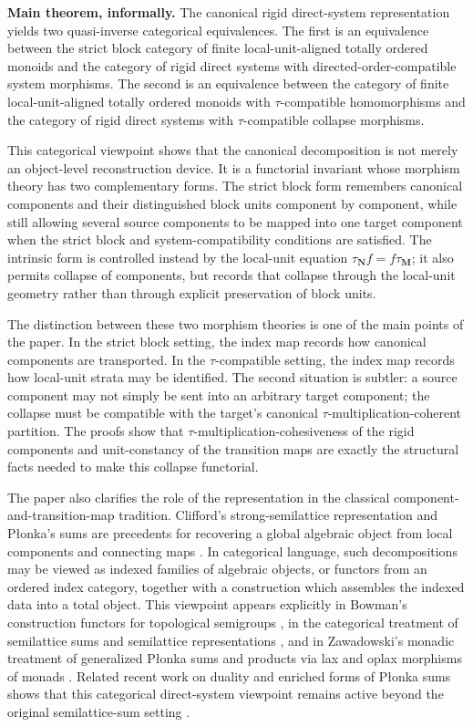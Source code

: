 \documentclass[pdflatex,sn-mathphys-num]{sn-jnl}
\theoremstyle{thmstyleone}%
\theoremstyle{thmstyletwo}%
\theoremstyle{thmstylethree}%
\begin{document}
\medskip
\noindent\textbf{Main theorem, informally.}
The canonical rigid direct-system representation yields two quasi-inverse categorical equivalences.
The first is an equivalence between the strict block category of finite local-unit-aligned totally ordered monoids and the category of rigid direct systems with directed-order-compatible system morphisms.
The second is an equivalence between the category of finite local-unit-aligned totally ordered monoids with \(\tau\)-compatible homomorphisms and the category of rigid direct systems with \(\tau\)-compatible collapse morphisms.
\medskip

This categorical viewpoint shows that the canonical decomposition is not merely an object-level reconstruction device.
It is a functorial invariant whose morphism theory has two complementary forms.
The strict block form remembers canonical components and their distinguished block units component by component, while still allowing several source components to be mapped into one target component when the strict block and system-compatibility conditions are satisfied.
The intrinsic form is controlled instead by the local-unit equation \(\tau_{\mathbf N}f=f\tau_{\mathbf M}\); it also permits collapse of components, but records that collapse through the local-unit geometry rather than through explicit preservation of block units.

The distinction between these two morphism theories is one of the main points of the paper.
In the strict block setting, the index map records how canonical components are transported.
In the \(\tau\)-compatible setting, the index map records how local-unit strata may be identified.
The second situation is subtler: a source component may not simply be sent into an arbitrary target component; the collapse must be compatible with the target's canonical \(\tau\)-multiplication-coherent partition.
The proofs show that \(\tau\)-multiplication-cohesiveness of the rigid components and unit-constancy of the transition maps are exactly the structural facts needed to make this collapse functorial.

The paper also clarifies the role of the representation in the classical component-and-transition-map tradition.
Clifford's strong-semilattice representation and P\l{}onka's sums are precedents for recovering a global algebraic object from local components and connecting maps \cite{Clifford1941,CliffordPreston1961,Plonka1967,Plonka1968}.
In categorical language, such decompositions may be viewed as indexed families of algebraic objects, or functors from an ordered index category, together with a construction which assembles the indexed data into a total object.
This viewpoint appears explicitly in Bowman's construction functors for topological semigroups \cite{Bowman1975}, in the categorical treatment of semilattice sums and semilattice representations \cite{RomanowskaSmith1991,RomanowskaSmith1997}, and in Zawadowski's monadic treatment of generalized P\l{}onka sums and products via lax and oplax morphisms of monads \cite{Zawadowski2015}.
Related recent work on duality and enriched forms of P\l{}onka sums shows that this categorical direct-system viewpoint remains active beyond the original semilattice-sum setting \cite{Bonzio2018,FuscoPaoli2025}.
\end{document}
